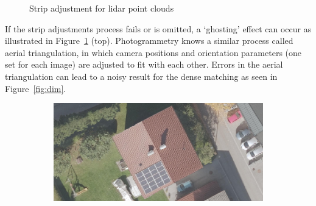 \begin{figure}
\begin{subfigure}{0.4\linewidth}
		\label{fig:lidarGableRoof}
	\end{subfigure}
	\caption{Strip adjustment for lidar point clouds}%
\label{fig:lidarStripAdj}
\end{figure}
If the strip adjustments process fails or is omitted, a `ghosting' effect can occur as illustrated in Figure~\ref{fig:lidarGableRoof} (top). 
Photogrammetry knows a similar process called aerial triangulation, in which camera positions and orientation parameters (one set for each image) are adjusted to fit with each other. Errors in the aerial triangulation can lead to a noisy result for the dense matching as seen in Figure~\ref{fig:dim}.
\begin{figure}
	\centering
	\begin{subfigure}{0.95\linewidth}
		\includegraphics[width=\textwidth]{figs/Roof_OP_NA_10cm.jpg}
		\label{fig:dim:a}
	\end{subfigure}
	

\end{figure}
